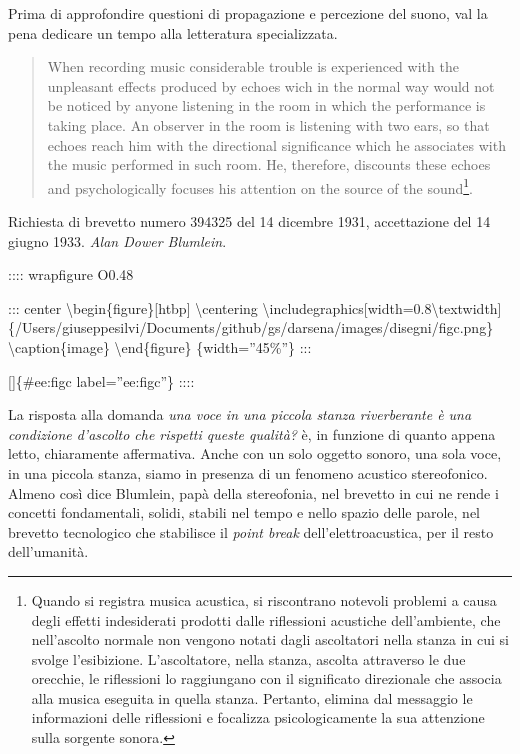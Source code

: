 \documentclass[a4paper,11pt]{article}
\begin{document}
Prima di approfondire questioni di propagazione e percezione del suono,
val la pena dedicare un tempo alla letteratura specializzata.

\begin{quote}
When recording music considerable trouble is experienced with the
unpleasant effects produced by echoes wich in the normal way would not
be noticed by anyone listening in the room in which the performance is
taking place. An observer in the room is listening with two ears, so
that echoes reach him with the directional significance which he
associates with the music performed in such room. He, therefore,
discounts these echoes and psychologically focuses his attention on
the source of the sound\footnote{Quando si registra musica acustica, si riscontrano notevoli
problemi a causa degli effetti indesiderati prodotti dalle
riflessioni acustiche dell'ambiente, che nell'ascolto normale non
vengono notati dagli ascoltatori nella stanza in cui si svolge
l'esibizione. L'ascoltatore, nella stanza, ascolta attraverso le due
orecchie, le riflessioni lo raggiungano con il significato
direzionale che associa alla musica eseguita in quella stanza.
Pertanto, elimina dal messaggio le informazioni delle riflessioni e
focalizza psicologicamente la sua attenzione sulla sorgente sonora.}.
\end{quote}

Richiesta di brevetto numero 394325 del 14 dicembre 1931, accettazione
del 14 giugno 1933. \emph{Alan Dower Blumlein}.

:::: wrapfigure
O0.48

::: center
\textbackslash{}begin\{figure\}{[}htbp{]}
  \textbackslash{}centering
  \textbackslash{}includegraphics{[}width=0.8\textbackslash{}textwidth{]}\{/Users/giuseppesilvi/Documents/github/gs/darsena/images/disegni/figc.png\}
  \textbackslash{}caption\{image\}
\textbackslash{}end\{figure\}
\{width=''45\%''\}
:::

{[}{]}\{\#ee:figc label=''ee:figc''\}
::::

La risposta alla domanda \emph{una voce in una piccola stanza riverberante è
una condizione d'ascolto che rispetti queste qualità?} è, in funzione di
quanto appena letto, chiaramente affermativa. Anche con un solo oggetto
sonoro, una sola voce, in una piccola stanza, siamo in presenza di un
fenomeno acustico stereofonico. Almeno così dice Blumlein, papà della
stereofonia, nel brevetto in cui ne rende i concetti fondamentali,
solidi, stabili nel tempo e nello spazio delle parole, nel brevetto
tecnologico che stabilisce il \emph{point break} dell'elettroacustica, per il
resto dell'umanità.
\end{document}
